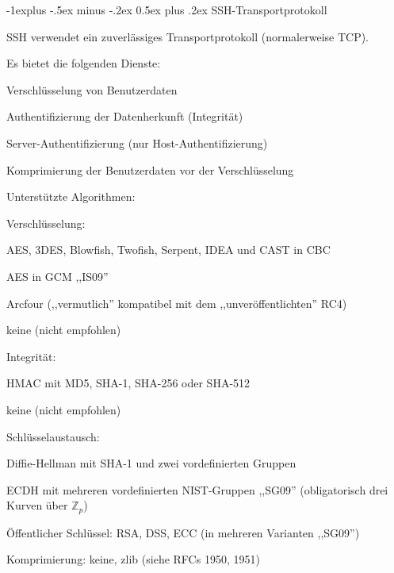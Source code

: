 \documentclass[a4paper]{article}
\makeatletter
\renewcommand{\subsection}{\@startsection{subsection}{2}{0mm}%
 {-1explus -.5ex minus -.2ex}%
 {0.5ex plus .2ex}%
 {\normalfont\normalsize\bfseries}}
\makeatother
\begin{document}
\begin{multicols}{3}
      \subsection{SSH-Transportprotokoll}
      \begin{itemize*}
            \item SSH verwendet ein zuverlässiges Transportprotokoll (normalerweise TCP).
            \item Es bietet die folgenden Dienste:
            \begin{itemize*}
                  \item Verschlüsselung von Benutzerdaten
                  \item Authentifizierung der Datenherkunft (Integrität)
                  \item Server-Authentifizierung (nur Host-Authentifizierung)
                  \item Komprimierung der Benutzerdaten vor der Verschlüsselung
            \end{itemize*}
            \item Unterstützte Algorithmen:
            \begin{itemize*}
                  \item Verschlüsselung:
                  \begin{itemize*}
                        \item AES, 3DES, Blowfish, Twofish, Serpent, IDEA und CAST in CBC
                        \item AES in GCM ,,IS09''
                        \item Arcfour (,,vermutlich'' kompatibel mit dem ,,unveröffentlichten'' RC4)
                        \item keine (nicht empfohlen) \end{itemize*}
                  \item Integrität:
                  \begin{itemize*}
                        \item HMAC mit MD5, SHA-1, SHA-256 oder SHA-512
                        \item keine (nicht empfohlen)
                  \end{itemize*}
                  \item Schlüsselaustausch:
                  \begin{itemize*}
                        \item Diffie-Hellman mit SHA-1 und zwei vordefinierten Gruppen
                        \item ECDH mit mehreren vordefinierten NIST-Gruppen ,,SG09'' (obligatorisch drei Kurven über $\mathbb{Z}_p$)
                        \item Öffentlicher Schlüssel: RSA, DSS, ECC (in mehreren Varianten ,,SG09'')
                  \end{itemize*}
                  \item Komprimierung: keine, zlib (siehe RFCs 1950, 1951)
            \end{itemize*}
      \end{itemize*}


\end{multicols}
\end{document}
